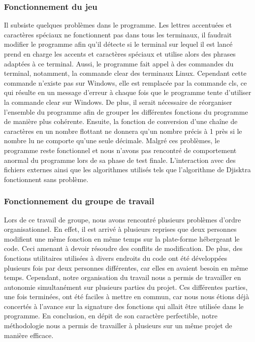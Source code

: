 \documentclass[a4paper, 12pt]{article}
\begin{document}
      \subsubsection{Fonctionnement du jeu}
      Il subsiste quelques problèmes dans le programme. Les lettres accentuées et caractères spéciaux ne fonctionnent pas dans tous les terminaux, il faudrait modifier le programme afin qu'il détecte si le terminal sur lequel il est lancé prend en charge les accents et caractères spéciaux et utilise alors des phrases adaptées à ce terminal.
      Aussi, le programme fait appel à des commandes du terminal, notamment, la commande clear des terminaux Linux. Cependant cette commande n'existe pas sur Windows, elle est remplacée par la commande cls, ce qui résulte en un message d'erreur à chaque fois que le programme tente d'utiliser la commande clear sur Windows.
      De plus, il serait nécessaire de réorganiser l'ensemble du programme afin de grouper les différentes fonctions du programme de manière plus cohérente.
      Ensuite, la fonction de conversion d'une chaîne de caractères en un nombre flottant ne donnera qu'un nombre précis à 1 près si le nombre lu ne comporte qu'une seule décimale.
      Malgré ces problèmes, le programme reste fonctionnel et nous n'avons pas rencontré de comportement anormal du programme lors de sa phase de test finale.
      L'interaction avec des fichiers externes ainsi que les algorithmes utilisés tels que l'algorithme de Djisktra fonctionnent sans problème.
      \subsubsection{Fonctionnement du groupe de travail}
       Lors de ce travail de groupe, nous avons rencontré plusieurs problèmes d'ordre organisationnel. En effet, il est arrivé à plusieurs reprises que deux personnes modifient une même fonction en même temps sur la plate-forme hébergeant le code. Ceci amenant à devoir résoudre des conflits de modification.
       De plus, des fonctions utilitaires utilisées à divers endroits du code ont été développées plusieurs fois par deux personnes différentes, car elles en avaient besoin en même temps.
       Cependant, notre organisation du travail nous a permis de travailler en autonomie simultanément sur plusieurs parties du projet. Ces différentes parties, une fois terminées, ont été faciles à mettre en commun, car nous nous étions déjà concertés à l'avance sur la signature des fonctions qui allait être utilisée dans le programme. En conclusion, en dépit de son caractère perfectible, notre méthodologie nous a permis de travailler à plusieurs sur un même projet de manière efficace.
\end{document}
